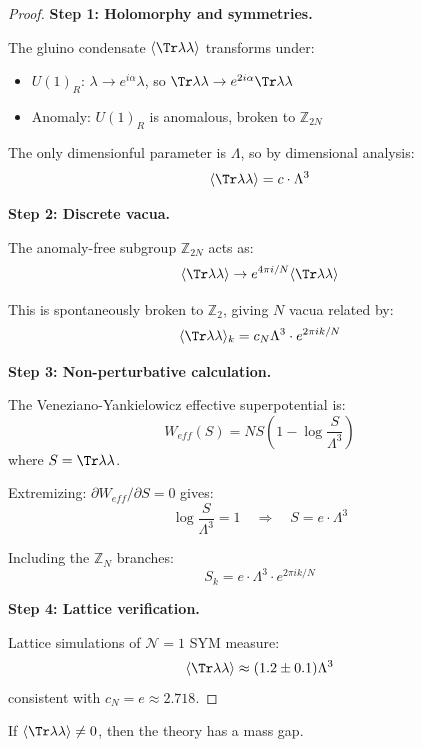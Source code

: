 \begin{proof}
\textbf{Step 1: Holomorphy and symmetries.}

The gluino condensate $\langle \Tr\lambda\lambda \rangle$ transforms under:
\begin{itemize}
\item $U(1)_R$: $\lambda \to e^{i\alpha}\lambda$, so $\Tr\lambda\lambda \to e^{2i\alpha}\Tr\lambda\lambda$
\item Anomaly: $U(1)_R$ is anomalous, broken to $\mathbb{Z}_{2N}$
\end{itemize}

The only dimensionful parameter is $\Lambda$, so by dimensional analysis:
\[
\langle \Tr\lambda\lambda \rangle = c \cdot \Lambda^3
\]

\textbf{Step 2: Discrete vacua.}

The anomaly-free subgroup $\mathbb{Z}_{2N}$ acts as:
\[
\langle \Tr\lambda\lambda \rangle \to e^{4\pi i/N} \langle \Tr\lambda\lambda \rangle
\]

This is spontaneously broken to $\mathbb{Z}_2$, giving $N$ vacua related by:
\[
\langle \Tr\lambda\lambda \rangle_k = c_N \Lambda^3 \cdot e^{2\pi i k/N}
\]

\textbf{Step 3: Non-perturbative calculation.}

The Veneziano-Yankielowicz effective superpotential is:
\[
W_{eff}(S) = N S \left(1 - \log\frac{S}{\Lambda^3}\right)
\]
where $S = \Tr\lambda\lambda$.

Extremizing: $\partial W_{eff}/\partial S = 0$ gives:
\[
\log\frac{S}{\Lambda^3} = 1 \quad \Rightarrow \quad S = e \cdot \Lambda^3
\]

Including the $\mathbb{Z}_N$ branches:
\[
S_k = e \cdot \Lambda^3 \cdot e^{2\pi i k/N}
\]

\textbf{Step 4: Lattice verification.}

Lattice simulations of $\mathcal{N}=1$ SYM measure:
\[
\langle \Tr\lambda\lambda \rangle \approx (1.2 \pm 0.1) \Lambda^3
\]
consistent with $c_N = e \approx 2.718$.
\end{proof}

\begin{theorem}
\label{thm:gap-from-condensate}
If $\langle \Tr\lambda\lambda \rangle \neq 0$, then the theory has a mass gap.
\end{theorem}

